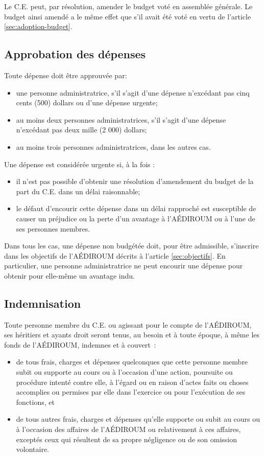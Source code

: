 \documentclass{aediroum}
\newcommand{\article}[1]{article \ref{#1}}
\begin{document}
Le C.E. peut, par résolution, amender le budget voté en assemblée générale. Le budget ainsi amendé a le même effet que s'il avait été voté en vertu de l'\article{sec:adoption-budget}.

\subsection{Approbation des dépenses}\label{sec:approbation-des-depenses}

Toute dépense doit être approuvée par:
\begin{itemize}
    \item une personne administratrice, s’il s’agit d’une dépense n’excédant pas cinq cents (500)
dollars ou d’une dépense urgente;
    \item au moins deux personnes administratrices, s’il s’agit d’une dépense n’excédant pas
deux mille (2 000) dollars;
	\item au moins trois personnes administratrices, dans les autres cas.
\end{itemize}
Une dépense est considérée urgente si, à la fois :
\begin{itemize}
    \item il n'est pas possible d'obtenir une résolution d'amendement du budget de la part du C.E. dans un délai raisonnable;
    \item le défaut d'encourir cette dépense dans un délai rapproché est susceptible de causer un préjudice ou la perte d'un avantage à l'AÉDIROUM ou à l'une de ses personnes membres.
\end{itemize}

Dans tous les cas, une dépense non budgétée doit, pour être admissible, s'inscrire dans les objectifs de l'AÉDIROUM décrits à l'\article{sec:objectifs}. En particulier, une personne administratrice ne peut encourir une dépense pour obtenir pour elle-même un avantage indu.

\subsection{Indemnisation}\label{sec:indemnisation}

Toute personne membre du C.E. ou agissant pour le compte de l’AÉDIROUM, ses héritiers et ayants droit seront tenus, au besoin et à toute époque, à même les fonds de l'AÉDIROUM, indemnes et à couvert~:
\begin{itemize}
\item de tous frais, charges et dépenses quelconques que cette personne membre subit ou supporte au cours ou à l'occasion d'une action, poursuite ou procédure intenté contre elle, à l'égard ou en raison d'actes faits ou choses accomplies ou permises par elle dans l'exercice ou pour l'exécution de ses fonctions, et
\item de tous autres frais, charges et dépenses qu'elle supporte ou subit au cours ou à l'occasion des affaires de l'AÉDIROUM ou relativement à ces affaires, exceptés ceux qui résultent de sa propre négligence ou de son omission volontaire.
\end{itemize}
\end{document}
